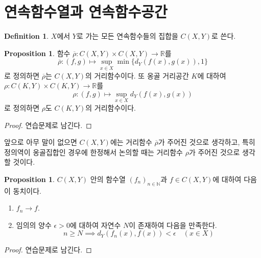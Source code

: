 \documentclass[11pt]{book}
\numberwithin{equation}{chapter}
\def\NN{\mathbb{N}}
\def\RR{\mathbb{R}}
\def\eps{\epsilon}
\theoremstyle{definition}
\newtheorem{prop}[thm]{Proposition}
\newtheorem{defn}[thm]{Definition}
\newenvironment{enum}
	{\begin{enumerate}[label=(\alph*), leftmargin=2\parindent]}
	{\end{enumerate}}
\begin{document}
\section{연속함수열과 연속함수공간}

\begin{defn}
    \(X\)에서 \(Y\)로 가는 모든 연속함수들의 집합을 \(C(X, Y)\)로 쓴다.
\end{defn}

\begin{prop}
    함수 \(\overline{\rho} : C(X, Y) \times C(X, Y) \to \RR\)를
    \[
    \overline{\rho} : (f, g) \mapsto \sup_{x \in X} \min\{d_Y(f(x), g(x)), 1\}
    \]
    로 정의하면 \(\overline{\rho}\)는 \(C(X, Y)\)의 거리함수이다. 또 옹골 거리공간 \(K\)에 대하여 \(\rho : C(K, Y) \times C(K, Y) \to \RR\)를
    \[
        \rho : (f, g) \mapsto \sup_{x \in X} d_Y(f(x), g(x))
    \]
    로 정의하면 \(\rho\)도 \(C(K, Y)\)의 거리함수이다.
\end{prop}
\begin{proof}
    연습문제로 남긴다.
\end{proof}

앞으로 아무 말이 없으면 \(C(X, Y)\)에는 거리함수 \(\overline{\rho}\)가 주어진 것으로 생각하고, 특히 정의역이 옹골집합인 경우에 한정해서 논의할 때는 거리함수 \(\rho\)가 주어진 것으로 생각할 것이다.

\begin{prop} \label{prop 10.1.2}
    \(C(X, Y)\) 안의 함수열 \((f_n)_{n \in \NN}\)과 \(f \in C(X, Y)\)에 대하여 다음이 동치이다.
    \begin{enum}
        \item \(f_n \to f\).
        \item 임의의 양수 \(\eps > 0\)에 대하여 자연수 \(N\)이 존재하여 다음을 만족한다.
        \[
        n \ge N \implies d_Y(f_n(x), f(x)) < \eps \quad (x \in X)    
        \]
    \end{enum}
\end{prop}
\begin{proof}
    연습문제로 남긴다.
\end{proof}
\end{document}
